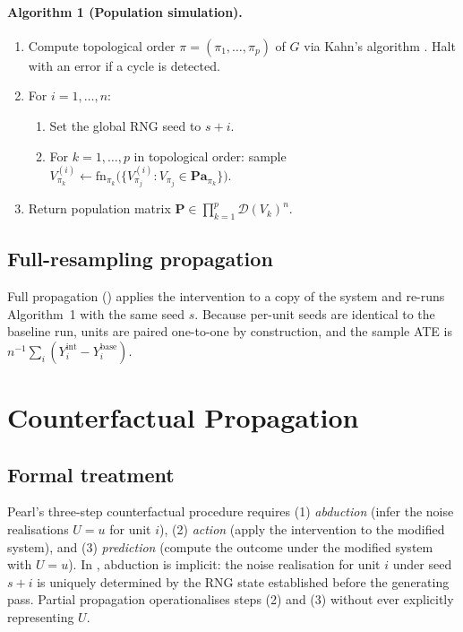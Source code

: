 \documentclass[article]{jss}
\begin{document}
\paragraph{Algorithm 1 (Population simulation).}
\begin{enumerate}
  \item Compute topological order $\pi = (\pi_1,\ldots,\pi_p)$ of $G$ via
        Kahn's algorithm \citep{kahn1962topological}. Halt with an error if
        a cycle is detected.
  \item For $i = 1,\ldots,n$:
        \begin{enumerate}
          \item Set the global RNG seed to $s + i$.
          \item For $k = 1,\ldots,p$ in topological order: sample
                $V_{\pi_k}^{(i)} \leftarrow
                \mathrm{fn}_{\pi_k}\!\bigl(\{V_{\pi_j}^{(i)} :
                V_{\pi_j}\in\mathbf{Pa}_{\pi_k}\}\bigr)$.
        \end{enumerate}
  \item Return population matrix $\mathbf{P}\in\prod_{k=1}^p\mathcal{D}(V_k)^n$.
\end{enumerate}

\subsection{Full-resampling propagation}
\label{sec:full_prop}

Full propagation () applies the intervention to a copy of the
system and re-runs Algorithm~1 with the same seed $s$. Because per-unit seeds are
identical to the baseline run, units are paired one-to-one by construction, and
the sample ATE is $n^{-1}\sum_i (Y_i^{\mathrm{int}} - Y_i^{\mathrm{base}})$.

\section{Counterfactual Propagation}
\label{sec:counterfactual}

\subsection{Formal treatment}
\label{sec:cf_formal}

Pearl's three-step counterfactual procedure \citep{pearl2009causality} requires
(1) \emph{abduction} (infer the noise realisations $U = u$ for unit $i$),
(2) \emph{action} (apply the intervention to the modified system), and
(3) \emph{prediction} (compute the outcome under the modified system with $U = u$).
In , abduction is implicit: the noise realisation for unit $i$
under seed $s + i$ is uniquely determined by the RNG state established before the
generating pass. Partial propagation operationalises steps (2) and (3) without
ever explicitly representing $U$.
\end{document}
